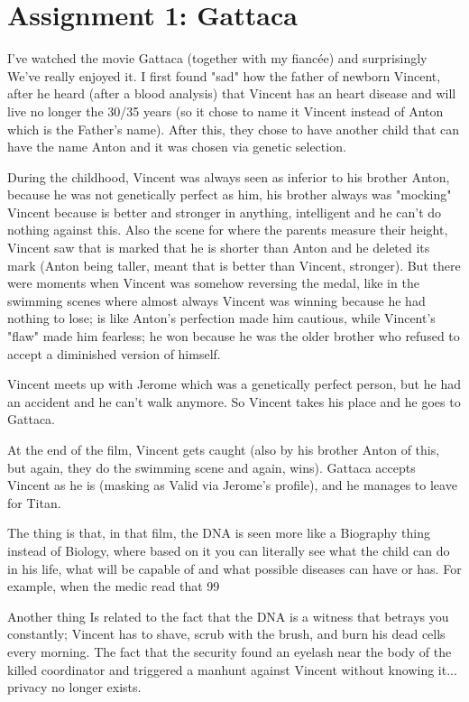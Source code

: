 \chapter{Assignment 1: Gattaca}

I've watched the movie Gattaca (together with my fiancée) and surprisingly We've really enjoyed it. 
I first found "sad" how the father of newborn Vincent, after he heard (after a blood analysis) that Vincent has an heart disease and will live no longer the 30/35 years (so it chose to name it Vincent instead of Anton which is the Father's name).
After this, they chose to have another child that can have the name Anton and it was chosen via genetic selection.

During the childhood, Vincent was always seen as inferior to his brother Anton, because he was not genetically perfect as him, his brother always was "mocking" Vincent because is better and stronger in anything, intelligent and he can't do nothing against this.
Also the scene for where the parents measure their height, Vincent saw that is marked that he is shorter than Anton and he deleted its mark (Anton being taller, meant that is better than Vincent, stronger).
But there were moments when Vincent was somehow reversing the medal, like in the swimming scenes where almost always Vincent was winning because he had nothing to lose; is like Anton's perfection made him cautious, while Vincent's "flaw" made him fearless; he won because he was the older brother who refused to accept a diminished version of himself.

Vincent meets up with Jerome which was a genetically perfect person, but he had an accident and he can't walk anymore. So Vincent takes his place and he goes to Gattaca. 

At the end of the film, Vincent gets caught (also by his brother Anton of this, but again, they do the swimming scene and again, wins).
Gattaca accepts Vincent as he is (masking as Valid via Jerome's profile), and he manages to leave for Titan.

The thing is that, in that film, the DNA is seen more like a Biography thing instead of Biology, where based on it you can literally see what the child can do in his life, what will be capable of and what possible diseases can have or has. For example, when the medic read that 99%

Another thing Is related to the fact that the DNA is a witness that betrays you constantly; Vincent has to shave, scrub with the brush, and burn his dead cells every morning. The fact that the security found an eyelash near the body of the killed coordinator and triggered a manhunt against Vincent without knowing it... privacy no longer exists.

